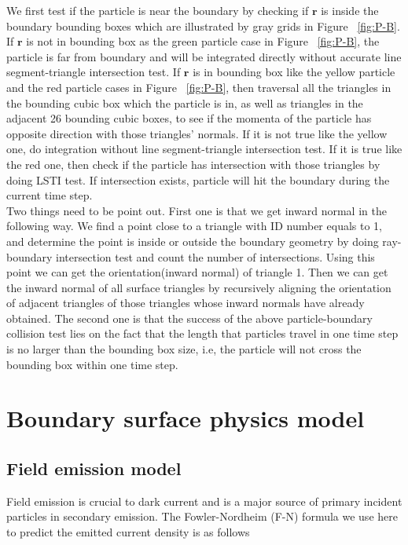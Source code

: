 \documentclass[a4paper,11pt]{article}
\begin{document}
We first test if the particle is near the boundary by checking if $\mathbf{r}$ is inside the boundary bounding boxes which are illustrated by gray grids in Figure ~\ref{fig:P-B}. If $\mathbf{r}$ is not in bounding box as the green particle case in Figure ~\ref{fig:P-B}, the particle is far from boundary and will be integrated directly without accurate line segment-triangle intersection test. If $\mathbf{r}$ is in bounding box like the yellow particle and the red particle cases in Figure ~\ref{fig:P-B}, then traversal all the triangles in the bounding cubic box which the particle is in, as well as triangles in the adjacent 26 bounding cubic boxes, to see if the momenta of the particle has opposite direction with those triangles' normals. If it is not true like the yellow one, do integration without line segment-triangle intersection test. If it is true like the red one, then check if the particle has intersection with those triangles by doing LSTI test. If intersection exists,  particle will hit the boundary during the current time step. \\

Two things need to be point out. First one is that we get inward normal in the following way. We find a point close to a triangle with ID number equals to 1, and determine the point is inside or outside the boundary geometry by doing ray-boundary intersection test and count the number of intersections. Using this point we can get the orientation(inward normal) of triangle 1. Then we can get the inward normal of all surface triangles by recursively aligning the orientation of adjacent triangles of those triangles whose inward normals have already obtained. The second one is that the success of the above particle-boundary collision test lies on the fact that the length that particles travel in one time step is no larger than the bounding box size, i.e, the particle will not cross the bounding box within one time step.\\
\section{Boundary surface physics model}
\subsection{Field emission model}
Field emission is crucial to dark current and is a major source of primary incident particles in secondary emission. The Fowler-Nordheim (F-N) formula we use here to predict the emitted current density is as follows \cite{BC} \cite{FN}\\
\end{document}
